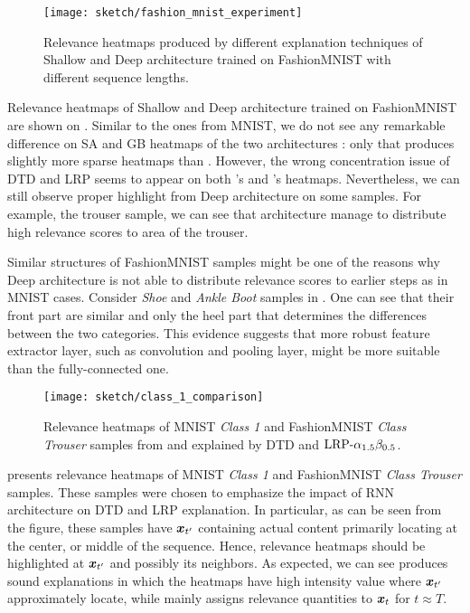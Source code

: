 \begin{figure}[!htb]
\centering
\texttt{[image: sketch/fashion\_mnist\_experiment]}
\caption{Relevance heatmaps produced by different explanation techniques of Shallow and Deep architecture trained on FashionMNIST with different sequence lengths. \heatmapscaleexplain}
\label{fig:fashion_mnist_experiment}
\end{figure}

Relevance heatmaps of Shallow and Deep architecture trained on  FashionMNIST  are shown on \addfigure{\ref{fig:fashion_mnist_experiment}}. Similar to the ones from MNIST, we do not see any remarkable difference on SA and GB heatmaps of the two architectures : only that  produces slightly more sparse heatmaps than . However, the wrong concentration issue of DTD and LRP seems to appear on both 's and 's heatmaps. Nevertheless, we can still observe proper highlight from Deep architecture on some samples. For example, the trouser sample, we can see  that  architecture manage to distribute high relevance scores to area of the trouser. 

Similar structures of FashionMNIST samples might be one of the reasons why Deep architecture is not able to distribute relevance scores to earlier steps as in MNIST cases. Consider \textit{Shoe} and \textit{Ankle Boot} samples in \addfigure{\ref{fig:fashion_mnist_samples}}. One can see that  their front part are similar and only the heel part that determines the differences between the two categories. This evidence suggests that  more robust feature extractor layer, such as convolution and pooling layer, might be more suitable than the fully-connected one.


 \begin{figure}[!htb]
\centering
\texttt{[image: sketch/class\_1\_comparison]}
\caption{Relevance heatmaps of MNIST \textit{Class 1} and FashionMNIST \textit{Class Trouser} samples from  and  explained by DTD and $\text{LRP-}\alpha_{1.5}\beta_{0.5}$. \heatmapscaleexplain }
\label{fig:class_1_comparison}
\end{figure}

\addfigure{\ref{fig:class_1_comparison}} presents relevance heatmaps of MNIST \textit{Class 1} and FashionMNIST \textit{Class Trouser} samples. These samples were chosen to emphasize the impact of RNN architecture on DTD and LRP explanation. In particular,  as can be seen from the figure, these samples have $\boldsymbol{x}_{t'}$ containing actual content  primarily locating at the center, or middle of the sequence. Hence, relevance heatmaps should be highlighted at $\boldsymbol{x}_{t'}$ and possibly its neighbors.  As expected, we can see  produces sound explanations in which the heatmaps have high intensity value where $\boldsymbol{x}_{t'}$ approximately locate, while  mainly assigns relevance quantities to $\boldsymbol{x}_{t}$ for $t \approx T$. 

